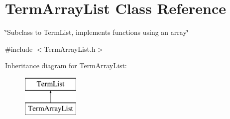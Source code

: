 \hypertarget{classTermArrayList}{\section{Term\-Array\-List Class Reference}
\label{classTermArrayList}
}


\char`\"{}\-Subclass to Term\-List, implements functions using an array\char`\"{}  




{\ttfamily \#include $<$Term\-Array\-List.\-h$>$}

Inheritance diagram for Term\-Array\-List\-:\begin{figure}[H]
\begin{center}
\leavevmode
\includegraphics[height=2.000000cm]{classTermArrayList}
\end{center}
\end{figure}
